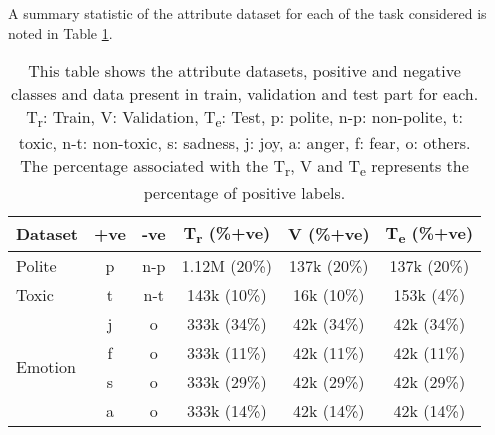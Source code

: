 A summary statistic of the attribute dataset for each of the task considered is noted in Table \ref{tab:attribute_dataset}.

\begin{table}[!htpb]
\scriptsize
\centering
\begin{tabular}{|l|c|c|c|c|c|}
\hline
\textbf{Dataset}    & \textbf{+ve} & \textbf{-ve} & \textbf{T\textsubscript{r} (\%+ve)} & \textbf{V (\%+ve)} & \textbf{T\textsubscript{e} (\%+ve)} \\ \hline
Polite & p     &   n-p  & 1.12M (20\%) & 137k (20\%) & 137k (20\%)\\ \hline
Toxic   & t        &   n-t   & 143k (10\%) & 16k (10\%) & 153k (4\%)\\ \hline
\multirow{4}{*}{Emotion}    & j           &   o      & 333k (34\%) & 42k (34\%) & 42k (34\%)\\
    & f           &   o      & 333k (11\%) & 42k (11\%) & 42k (11\%)\\ 
    & s           &   o      & 333k (29\%) & 42k (29\%) & 42k (29\%)\\ 
    & a           &   o      & 333k (14\%) & 42k (14\%) & 42k (14\%)\\ \hline
\end{tabular}
\caption{\scriptsize{This table shows the attribute datasets, positive and negative classes and data present in train, validation and test part for each. T\textsubscript{r}: Train, V: Validation, T\textsubscript{e}: Test, p: polite, n-p: non-polite, t: toxic, n-t: non-toxic, s: sadness, j: joy, a: anger, f: fear, o: others. The percentage associated with the  T\textsubscript{r}, V and  T\textsubscript{e} represents the percentage of positive labels.}}
\label{tab:attribute_dataset}
\end{table}





